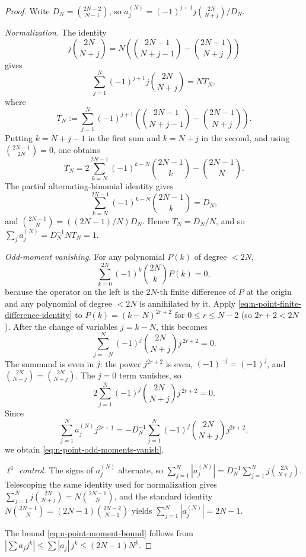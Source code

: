\begin{proof}
Write \(D_N=\binom{2N-2}{N-1}\), so
\(a_j^{(N)} = (-1)^{j+1} j \binom{2N}{N+j} / D_N\).

\emph{Normalization.}  The identity
\[
        j\binom{2N}{N+j}
        =N\left(\binom{2N-1}{N+j-1}-\binom{2N-1}{N+j}\right)
\]
gives
\[
\sum_{j=1}^N(-1)^{j+1}j\binom{2N}{N+j}
=N T_N,
\]
where
\[
T_N:=\sum_{j=1}^N(-1)^{j+1}
\left(\binom{2N-1}{N+j-1}-\binom{2N-1}{N+j}\right).
\]
Putting \(k=N+j-1\) in the first sum and \(k=N+j\) in the second,
and using \(\binom{2N-1}{2N}=0\), one obtains
\[
        T_N=2\sum_{k=N}^{2N-1}(-1)^{k-N}\binom{2N-1}{k}
             -\binom{2N-1}{N}.
\]
The partial alternating-binomial identity gives
\[
        \sum_{k=N}^{2N-1}(-1)^{k-N}\binom{2N-1}{k}=D_N,
\]
and
\(\binom{2N-1}{N}=((2N-1)/N)D_N\).  Hence \(T_N=D_N/N\), and so
\(\sum_j a_j^{(N)}=D_N^{-1}NT_N=1\).

\emph{Odd-moment vanishing.}  For any polynomial \(P(k)\) of degree
\(<2N\),
\begin{equation}
\label{eq:n-point-finite-difference-identity}
        \sum_{k=0}^{2N}(-1)^k\binom{2N}{k}P(k) = 0,
\end{equation}
because the operator on the left is the \(2N\)-th finite difference of
\(P\) at the origin and any polynomial of degree \(<2N\) is annihilated
by it.  Apply \eqref{eq:n-point-finite-difference-identity} to
\(P(k)=(k-N)^{2r+2}\) for \(0\le r\le N-2\) (so \(2r+2 < 2N\)).  After
the change of variables \(j=k-N\), this becomes
\[
        \sum_{j=-N}^N(-1)^j\binom{2N}{N+j}j^{\,2r+2}=0.
\]
The summand is even in \(j\): the power \(j^{2r+2}\) is even,
\((-1)^{-j}=(-1)^j\), and
\(\binom{2N}{N-j}=\binom{2N}{N+j}\).  The \(j=0\) term vanishes, so
\[
        2\sum_{j=1}^N(-1)^j\binom{2N}{N+j}j^{\,2r+2}=0.
\]
Since
\[
        \sum_{j=1}^N a_j^{(N)}j^{2r+1}
        =-D_N^{-1}
          \sum_{j=1}^N(-1)^j\binom{2N}{N+j}j^{2r+2},
\]
we obtain \eqref{eq:n-point-odd-moments-vanish}.

\emph{\(\ell^1\) control.}  The signs of \(a_j^{(N)}\) alternate, so
\(\sum_{j=1}^N|a_j^{(N)}| = D_N^{-1}\sum_{j=1}^N j\binom{2N}{N+j}\).
Telescoping the same identity used for normalization gives
\(\sum_{j=1}^N j\binom{2N}{N+j}=N\binom{2N-1}{N}\), and the standard
identity \(N\binom{2N-1}{N}=(2N-1)\binom{2N-2}{N-1}\) yields
\(\sum_{j=1}^N|a_j^{(N)}|=2N-1\).

The bound \eqref{eq:n-point-moment-bound} follows from
\(|\sum a_j j^k| \le \sum|a_j|\,j^k \le (2N-1)N^k\).
\end{proof}

